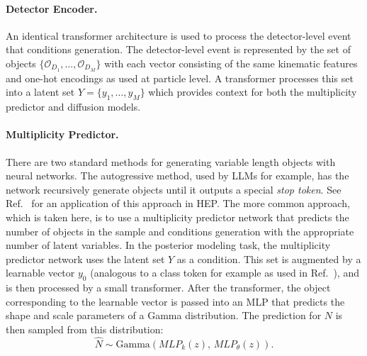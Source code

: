\paragraph{Detector Encoder.}
An identical transformer architecture is used to process the detector-level event that conditions generation.
The detector-level event is represented by the set of objects $\{\mathcal{O}_{D_1}, \ldots, \mathcal{O}_{D_M}\}$ with each vector consisting of the same kinematic features and one-hot encodings as used at particle level.
A transformer processes this set into a latent set $Y = \{y_1, \ldots, y_M\}$ which provides context for both the multiplicity predictor and diffusion models.

\paragraph{Multiplicity Predictor.}
There are two standard methods for generating variable length objects with neural networks.
The autogressive method, used by LLMs for example, has the network recursively generate objects until it outputs a special \textit{stop token}.
See Ref.~\cite{Butter:2023fov} for an application of this approach in HEP.
The more common approach, which is taken here, is to use a multiplicity predictor network that predicts the number of objects in the sample and conditions generation with the appropriate number of latent variables.
In the posterior modeling task, the multiplicity predictor network uses the latent set $Y$ as a condition.
This set is augmented by a learnable vector $y_0$ (analogous to a class token for example as used in Ref.~\cite{Qu:2022mxj}), and is then processed by a small transformer.
After the transformer, the object corresponding to the learnable vector is passed into an MLP that predicts the shape and scale parameters of a Gamma distribution.
The prediction for $N$ is then sampled from this distribution:
\begin{equation}
  \hat{N} \sim \mathrm{Gamma}\!\left(MLP_k(z),\, MLP_\theta(z)\right).
  \label{eq:vl_vld_multiplicity}
\end{equation}

